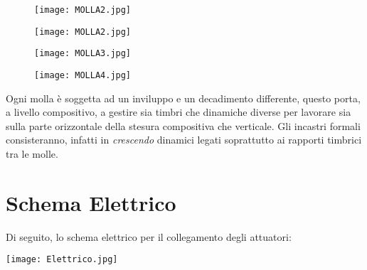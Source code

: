  \begin{figure}[htbp]
        \centering
        \texttt{[image: MOLLA2.jpg]}
\end{figure}

 \begin{figure}[htbp]
        \centering
        \texttt{[image: MOLLA2.jpg]}
\end{figure}

 \begin{figure}[htbp]
        \centering
        \texttt{[image: MOLLA3.jpg]}
\end{figure}

 \begin{figure}[htbp]
        \centering
        \texttt{[image: MOLLA4.jpg]}
\end{figure}

Ogni molla è soggetta ad un inviluppo e un decadimento differente, questo porta, a livello compositivo, a gestire sia timbri che dinamiche diverse per lavorare sia sulla parte orizzontale della stesura compositiva che verticale. Gli incastri formali consisteranno, infatti in \textit{crescendo} dinamici legati soprattutto ai rapporti timbrici tra le molle.


\section{Schema Elettrico}
Di seguito, lo schema elettrico per il collegamento degli attuatori:
\begin{center}
\texttt{[image: Elettrico.jpg]}
\end{center}
